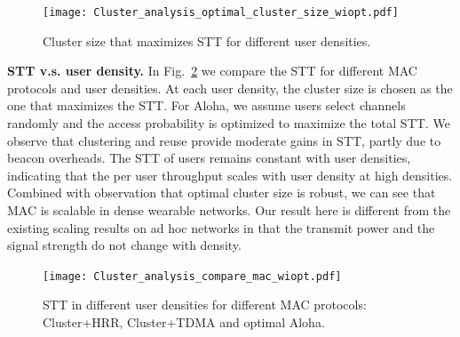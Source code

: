 \documentclass[10pt, conference, letterpaper]{IEEEtran}
\begin{document}
\begin{figure}
	\centering
	\texttt{[image: Cluster\_analysis\_optimal\_cluster\_size\_wiopt.pdf]}
	\caption{Cluster size that maximizes STT for different user densities.}
	\label{fig:clustereanalysis:optimal_cluster_size}
\end{figure}

\textbf{STT v.s. user density.} In Fig.~\ref{fig:clusteranalysis:compare_mac} we compare the STT for different MAC protocols and user densities. 
At each user density, the cluster size is chosen as the one that maximizes the STT. %
For Aloha, we assume users select channels randomly and the access probability is optimized to maximize the total STT. 
We observe that clustering and reuse provide moderate gains in STT, partly due to beacon overheads. %
The STT of users remains constant with user densities, indicating that the per user throughput scales with user density at high densities.
Combined with observation that optimal cluster size is robust, we can see that MAC is scalable in dense wearable networks.
Our result here is different from the existing scaling results on ad hoc networks in that the transmit power and the signal strength do not change with density.
 

\begin{figure}
	\centering
	\texttt{[image: Cluster\_analysis\_compare\_mac\_wiopt.pdf]}
	\caption{STT in different user densities for different MAC protocols: Cluster+HRR, Cluster+TDMA and optimal Aloha.}
	\label{fig:clusteranalysis:compare_mac}
\end{figure}

\end{document}

